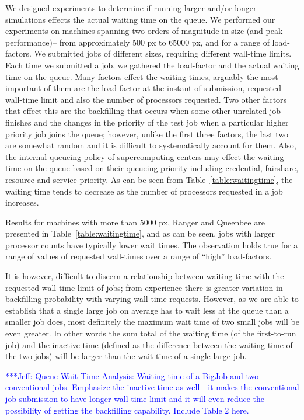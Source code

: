\documentclass[conference,final]{IEEEtran}
\newcommand{\skonote}[1]{ {\textcolor{blue} { ***Jeff: #1 }}}
\newcommand{\skonote}[1]{}
\begin{document}
We designed experiments to determine if running larger and/or longer simulations effects the actual waiting time on the queue. We performed our experiments on machines spanning two orders of magnitude in size (and peak performance)-- from approximately 500 px to 65000 px, and for a range of load-factors.  We submitted jobs of different sizes, requiring different wall-time limits. Each time we submitted a job, we gathered the load-factor and the actual waiting time on the queue. Many factors effect the waiting times, arguably the most important of them are the load-factor at the instant of submission, requested wall-time limit and also the number of processors requested. Two other factors that effect this are the backfilling that occurs when some other unrelated job finishes and the changes in the priority of the test job when a particular higher priority job joins the queue; however, unlike the first three factors, the last two are somewhat random and it is difficult to systematically account for them. Also, the internal queueing policy of supercomputing centers may effect the waiting time on the queue based on their queueing priority including credential, fairshare, resource and service priority.  As can be seen from Table~\ref{table:waitingtime}, the waiting time tends to decrease as the number of processors requested in a job increases.

Results for machines with more than 5000 px, Ranger and Queenbee are presented in Table~\ref{table:waitingtime}, and as can be seen, jobs with larger processor counts have typically lower wait times. The observation holds true for a range of values of requested wall-times over a range of ``high'' load-factors.

It is however, difficult to discern a relationship between waiting time with the requested wall-time limit of jobs; from experience there is greater variation in backfilling probability with varying wall-time requests.  However, as we are able to establish that a single large job on average has to wait less at the queue than a smaller job does, most definitely the maximum wait time of two small jobs will be even greater. In other words the sum total of the waiting time (of the first-to-run job) and the inactive time (defined as the difference between the waiting time of the two jobs) will be larger than the wait time of a single large job.
\newline


\skonote{Queue Wait Time Analysis: Waiting time of a BigJob and two conventional jobs. Emphasize the inactive time as well - it makes the conventional job submission to have longer wall time limit and it will even reduce the possibility of getting the backfilling capability. Include Table 2 here.}
\end{document}
